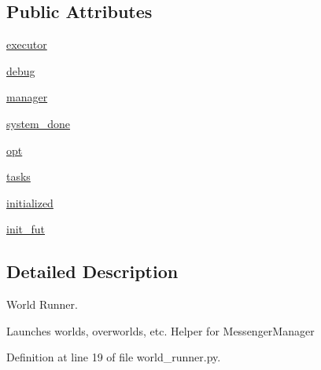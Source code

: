 \subsection*{Public Attributes}
\begin{DoxyCompactItemize}
\item 
\hyperlink{classparlai_1_1chat__service_1_1services_1_1messenger_1_1world__runner_1_1MessengerWorldRunner_aceef013023890c5d9590289d8039adbb}{executor}
\item 
\hyperlink{classparlai_1_1chat__service_1_1services_1_1messenger_1_1world__runner_1_1MessengerWorldRunner_a2f850eb160165940f64fdec3f0a8af8f}{debug}
\item 
\hyperlink{classparlai_1_1chat__service_1_1services_1_1messenger_1_1world__runner_1_1MessengerWorldRunner_a93b2e11a3222ab28f53520b30e72fd7c}{manager}
\item 
\hyperlink{classparlai_1_1chat__service_1_1services_1_1messenger_1_1world__runner_1_1MessengerWorldRunner_af1c6f26b752a0bcfd4c86c3d963bfe72}{system\+\_\+done}
\item 
\hyperlink{classparlai_1_1chat__service_1_1services_1_1messenger_1_1world__runner_1_1MessengerWorldRunner_a42ff6ed9074e14be34091499649f6935}{opt}
\item 
\hyperlink{classparlai_1_1chat__service_1_1services_1_1messenger_1_1world__runner_1_1MessengerWorldRunner_abadbc6d1ea38c2281e6bd1b893425671}{tasks}
\item 
\hyperlink{classparlai_1_1chat__service_1_1services_1_1messenger_1_1world__runner_1_1MessengerWorldRunner_a688d3920aa8dc6a7a5e31d0968e5c718}{initialized}
\item 
\hyperlink{classparlai_1_1chat__service_1_1services_1_1messenger_1_1world__runner_1_1MessengerWorldRunner_a0f3ae4787645f946c6a34ebce8fa4e42}{init\+\_\+fut}
\end{DoxyCompactItemize}


\subsection{Detailed Description}
\begin{DoxyVerb}World Runner.

Launches worlds, overworlds, etc. Helper for MessengerManager
\end{DoxyVerb}
 

Definition at line 19 of file world\+\_\+runner.\+py.



